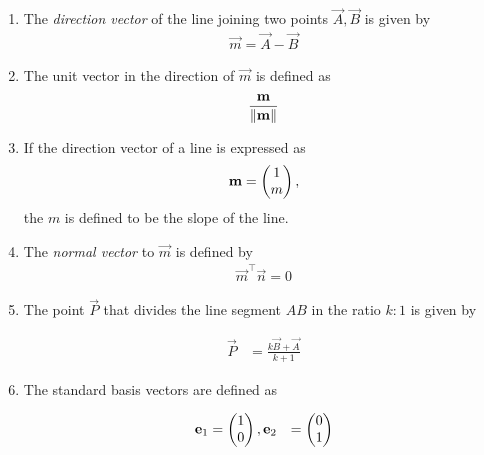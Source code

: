 \documentclass[journal,12pt,twocolumn]{IEEEtran}
\renewcommand\thesection{\arabic{section}}
\renewcommand\thesubsection{\thesection.\arabic{subsection}}
\begin{document}
\begin{enumerate}[label=\thesubsection.\arabic*.,ref=\thesubsection.\theenumi]
  \item The {\em direction vector} of the line joining two points $\vec{A},\vec{B}$ is given by 
  \begin{align}
    \label{eq:dir_vec}
    \vec{m} = \vec{A}-\vec{B}
  \end{align}
\item The unit vector in the direction of $\vec{m}$ is defined as
\begin{align}
    \frac{\mathbf{m}}{\left\lVert\mathbf{m}\right\rVert}
\end{align}
\item If the direction vector of a line is expressed as 
	\begin{align}
    \mathbf{m} = \begin{pmatrix}1\\m\end{pmatrix},
\end{align}
 the $m$ is defined to be the {\em} slope of the line. 
  \item The {\em normal vector} to $\vec{m}$ is defined by 
  \begin{align}
    \label{eq:normal_vec}
    \vec{m}^{\top}  \vec{n} = 0
  \end{align}
  \item The point $\vec{P}$ that divides the line segment $AB$ in the ratio $k:1$  is given by 

  \begin{align}
	  \vec{P}&= \frac{k\vec{B}+ \vec{A}}{k+1}
	  \label{eq:section_formula}
  \end{align}
\item  The standard basis vectors are defined as 

  \begin{align}
  \mathbf{e}_1&= \begin{pmatrix}1\\0\end{pmatrix}, 
  \mathbf{e}_2&= \begin{pmatrix}0\\1\end{pmatrix} 
  \end{align}
\end{enumerate}
\end{document}
